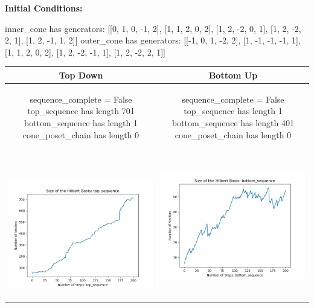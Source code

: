 \documentclass[10pt]{article}
\begin{document}
\textbf{Initial Conditions:}
\begin{SAGE}
inner_cone has generators: 
[[0, 1, 0, -1, 2], [1, 1, 2, 0, 2], [1, 2, -2, 0, 1], [1, 2, -2, 2, 1], [1, 2, -1, 1, 2]]
outer_cone has generators: 
[[-1, 0, 1, -2, 2], [1, -1, -1, -1, 1], [1, 1, 2, 0, 2], [1, 2, -2, -1, 1], [1, 2, -2, 2, 1]]

\end{SAGE}
\begin{tabular}{c|c}
\textbf{Top Down} & \textbf{Bottom Up} \\ \hline  
\begin{SAGE}
	sequence_complete = False
	top_sequence has length 701
	bottom_sequence has length 1
	cone_poset_chain has length 0
\end{SAGE} 
&
\begin{SAGE}
	sequence_complete = False
	top_sequence has length 1
	bottom_sequence has length 401
	cone_poset_chain has length 0
\end{SAGE} 
\\ \hline
\
\begin{minipage}{.45\textwidth}
\includegraphics[width=\textwidth]{"DATA/5d/5 generators 2 bound I/top_sequence SIZE"}
\end{minipage} &
\begin{minipage}{.45\textwidth}
\includegraphics[width=\textwidth]{"DATA/5d/5 generators 2 bound I bottomup/bottom_sequence SIZE"}

\end{minipage}
\end{tabular}
\end{document}
